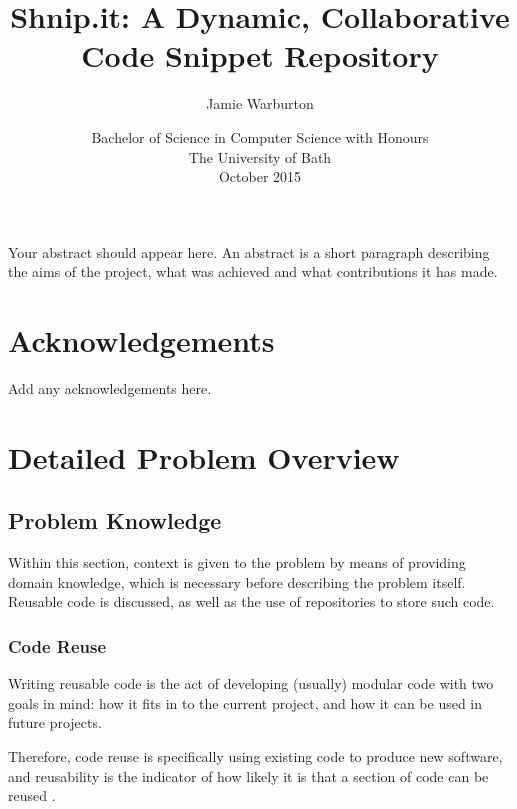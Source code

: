 \documentclass[11pt,openright,a4paper]{report}
\title{Shnip.it: A Dynamic, Collaborative Code Snippet Repository}
\author{Jamie Warburton}
\date{Bachelor of Science in Computer Science with Honours\\The University of Bath\\October 2015}
\begin{document}
\lstset{language=Java,breaklines,breakatwhitespace,basicstyle=\small}


\setcounter{page}{0}


\maketitle
\newpage


\newpage


\newpage


\abstract
Your abstract should appear here.  An abstract is a short
paragraph describing the aims of the project, what was
achieved and what contributions it has made.
\newpage


\tableofcontents
\newpage
\listoffigures
\newpage
\listoftables
\newpage


\chapter*{Acknowledgements}
Add any acknowledgements here.
\newpage


\setcounter{page}{1}



\chapter{Detailed Problem Overview}
\section{Problem Knowledge}
Within this section, context is given to the problem by means of providing domain knowledge, which is necessary before describing the problem itself. 
Reusable code is discussed, as well as the use of repositories to store such code. 

\subsection{Code Reuse}
Writing reusable code is the act of developing (usually) modular code with two goals in mind: how it fits in to the current project, and how it can be used in future projects.

Therefore, code reuse is specifically using existing code to produce new software, and reusability is the indicator of how likely it is that a section of code can be reused \cite{Frakes2005}.
 
\end{document}
